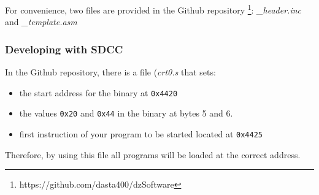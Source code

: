         For convenience, two files are provided in the Github repository
        \footnote{https://github.com/dasta400/dzSoftware}:
        \textit{\_header.inc} and \textit{\_template.asm}

        \subsubsection{Developing with SDCC}

        In the Github repository, there is a file (\textit{crt0.s} that sets:
        \begin{itemize}
            \item the start address for the binary at \texttt{0x4420}
            \item the values \texttt{0x20} and \texttt{0x44} in the binary at bytes
            5 and 6.
            \item first instruction of your program to be started located at
            \texttt{0x4425}
        \end{itemize}

        Therefore, by using this file all programs will be loaded at the correct
        address.